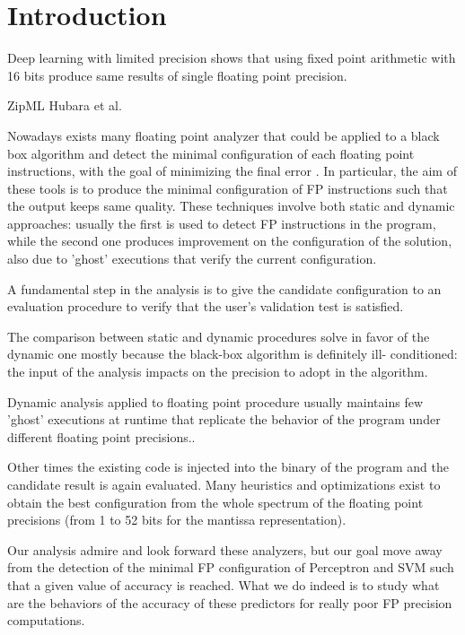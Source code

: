\documentclass[sigplan,review,anonymous=false]{acmart}\settopmatter{printfolios=true,printccs=false,printacmref=false}
\begin{document}
\section{Introduction}
Deep learning with limited precision shows that using fixed point arithmetic with 16 bits produce same results of single floating point precision. 

ZipML
Hubara et al.



Nowadays exists many floating point analyzer that could be applied to a black box algorithm and detect the minimal configuration of each floating point instructions, with the goal of minimizing the final error \cite{reducelam}\cite{mixpreclam}\cite{precimonious}\cite{blame}. In particular, the aim of these tools is to produce the minimal configuration of FP instructions such that the output keeps same quality. 
These techniques involve both static and dynamic approaches: usually the first is used to detect FP instructions in the program, while the second one produces improvement on the configuration of the solution, also due to 'ghost' executions that verify the current configuration.

A fundamental step in the analysis is to give the candidate configuration to an evaluation procedure to verify that the user's validation test is satisfied.

The comparison between static and dynamic procedures solve in favor of the dynamic one mostly because the black-box algorithm is definitely ill- conditioned: the input of the analysis impacts on the precision to adopt in the algorithm.

Dynamic analysis applied to floating point procedure usually maintains few 'ghost' executions at runtime that replicate the behavior of the program under different floating point precisions.\cite{blame}\cite{precimonious}.

Other times the existing code is injected into the binary of the program and the candidate result is again evaluated. Many heuristics and optimizations exist to obtain the best configuration from the whole spectrum of the floating point precisions (from 1 to 52 bits for the mantissa representation)\cite{mixpreclam}\cite{reducelam}.

Our analysis admire and look forward these analyzers, but our goal move away from the detection of the minimal FP configuration of Perceptron and SVM such that a given value of accuracy is reached. What we do indeed is to study what are the behaviors of the accuracy of these predictors for really poor FP precision computations. 
\end{document}
